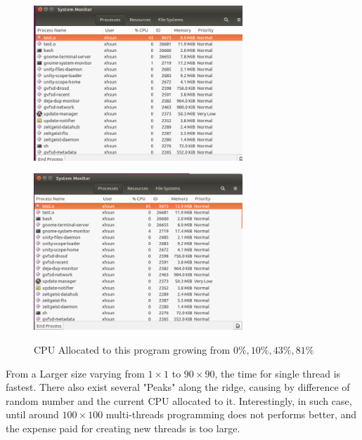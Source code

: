 \documentclass[12pt,a4paper]{article}
\begin{document}
\begin{minipage}{0.4\textwidth}
	\begin{figure}[H]
		\centering
		\includegraphics[width=0.7\textwidth]{./fig/Screenshot_43.png}
	\end{figure}
\end{minipage}
\begin{minipage}{0.4\textwidth}
	\begin{figure}[H]
		\centering
		\includegraphics[width=0.7\textwidth]{./fig/Screenshot_81.png}
	\end{figure}
\end{minipage}
\begin{figure}[htbp]
	\centering
	\caption{CPU Allocated to this program growing from $0\%,10\%,43\%,81\% $}
	\label{fig:: CPU Allocated}
\end{figure}

From a Larger size varying from $1\times 1 $ to $90\times 90$, the time for single thread is fastest. There also exist several "Peaks" along the ridge, causing by difference of random number and the current CPU allocated to it.
Interestingly, in such case, until around $100\times 100$ multi-threads programming does not performs better, and the expense paid for creating new threads is too large.
\end{document}
